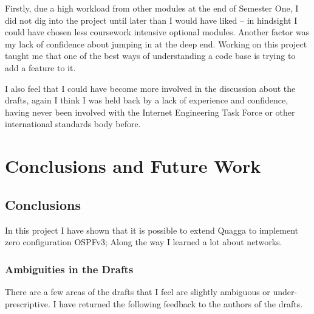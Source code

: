 \documentclass[12pt,a4paper,twoside]{report}
\begin{document}
Firstly, due a high workload from other modules at the end of Semester One, I
did not dig into the project until later than I would have liked -- in
hindsight I could have chosen less coursework intensive optional modules.
Another factor was my lack of confidence about jumping in at the deep end.
Working on this project taught me that one of the best ways of understanding
a code base is trying to add a feature to it.

I also feel that I could have become more involved in the discussion about the
drafts, again I think I was held back by a lack of experience and confidence,
having never been involved with the Internet Engineering Task Force or
other international standards body before. 

\chapter{Conclusions and Future Work}

\section{Conclusions}
In this project I have shown that it is possible to extend Quagga to implement
zero configuration OSPFv3; Along the way I learned a lot about networks. 

\subsection{Ambiguities in the Drafts}
There are a few areas of the drafts that I feel are slightly ambiguous or
under-prescriptive. I have returned the following feedback to the authors of
the drafts. 
\end{document}
